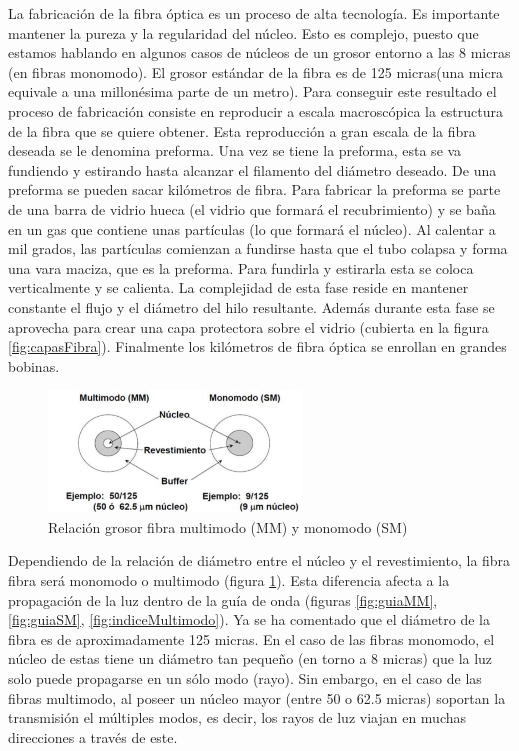 \begin{itemize}
 La fabricación de la fibra óptica es un proceso de alta tecnología. Es importante mantener la pureza y la regularidad del núcleo. Esto es complejo, puesto que estamos hablando en algunos casos de núcleos de un grosor entorno a las 8 micras (en fibras monomodo). El grosor estándar de la fibra es de 125 micras(una micra equivale a una millonésima parte de un metro). Para conseguir este resultado el proceso de fabricación consiste en reproducir a escala macroscópica la estructura de la fibra que se quiere obtener. Esta reproducción a gran escala de la fibra deseada se le denomina preforma. Una vez se tiene la preforma, esta se va fundiendo y estirando hasta alcanzar el filamento del diámetro deseado. De una preforma se pueden sacar kilómetros de fibra. Para fabricar la preforma se parte de una barra de vidrio hueca (el vidrio que formará el recubrimiento) y se baña en un gas que contiene unas partículas (lo que formará el núcleo). Al calentar a mil grados, las partículas comienzan a fundirse hasta que el tubo colapsa y forma una vara maciza, que es la preforma. Para fundirla y estirarla esta se coloca verticalmente y se calienta. La complejidad de esta fase reside en mantener constante el flujo y el diámetro del hilo resultante. Además durante esta fase se aprovecha para crear una capa protectora sobre el vidrio (cubierta en la figura \ref{fig:capasFibra}). Finalmente los kilómetros de fibra óptica se enrollan en grandes bobinas. \cite{fabricacionFO}
 
  \begin{figure}[H]
 	\centering
 	\includegraphics[width=0.6\textwidth]{./img/MM-SM}
 	\caption{Relación grosor fibra multimodo (MM) y monomodo (SM) \cite{imgRadioModo} } 
 	\label{fig:modoMonoMulti}
 \end{figure} 
 
  Dependiendo de la relación de diámetro entre el núcleo y el revestimiento, la fibra fibra será monomodo o multimodo (figura \ref{fig:modoMonoMulti}). Esta diferencia afecta a la propagación de la luz dentro de la guía de onda (figuras \ref{fig:guiaMM}, \ref{fig:guiaSM}, \ref{fig:indiceMultimodo}). Ya se ha comentado que el diámetro de la fibra es de aproximadamente 125 micras. En el caso de las fibras monomodo, el núcleo de estas tiene un diámetro tan pequeño (en torno a 8 micras) que la luz solo puede propagarse en un sólo modo (rayo). Sin embargo, en el caso de las fibras multimodo, al poseer un núcleo mayor (entre 50 o 62.5 micras) soportan la transmisión el múltiples modos, es decir, los rayos de luz viajan en muchas direcciones a través de este. \cite{FOA} 
   

\end{itemize}
